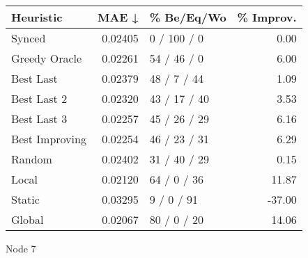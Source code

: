 \begin{tabular}{lrlr}
\toprule
\textbf{Heuristic} & \textbf{MAE ↓} & \textbf{\% Be/Eq/Wo} & \textbf{\% Improv.} \\
\midrule
            Synced &        0.02405 &          0 / 100 / 0 &                0.00 \\
     Greedy Oracle &        0.02261 &          54 / 46 / 0 &                6.00 \\
         Best Last &        0.02379 &          48 / 7 / 44 &                1.09 \\
       Best Last 2 &        0.02320 &         43 / 17 / 40 &                3.53 \\
       Best Last 3 &        0.02257 &         45 / 26 / 29 &                6.16 \\
    Best Improving &        0.02254 &         46 / 23 / 31 &                6.29 \\
            Random &        0.02402 &         31 / 40 / 29 &                0.15 \\
             Local &        0.02120 &          64 / 0 / 36 &               11.87 \\
            Static &        0.03295 &           9 / 0 / 91 &              -37.00 \\
            Global &        0.02067 &          80 / 0 / 20 &               14.06 \\
\bottomrule
\end{tabular}
\caption{Node 7}
\label{tab:non_lr01_le1_bs2_7}
